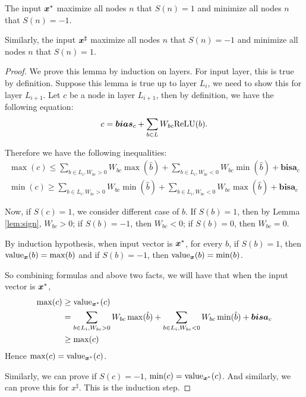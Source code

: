 	\begin{lemma}\label{lem:key1}\label{lemma2}
		
		
		
		The input $\boldsymbol{x}^*$ maximize all nodes $n$ that $S(n)=1$ and minimize all nodes $n$ that $S(n)=-1$.
		
		Similarly, the input $\boldsymbol{x}^\sharp$ maximize all nodes $n$ that $S(n)=-1$ and minimize all nodes $n$ that $S(n)=1$.
	\end{lemma}
	
	\begin{proof}
		We prove this lemma by induction on layers. For input layer, this is true by definition. Suppose this lemma is true up to layer $L_i$, we need to show this for layer $L_{i+1}$. Let $c$ be a node in layer $L_{i+1}$, then by definition, we have the following equation: \begin{align*}
			c = \boldsymbol{bias}_c+\sum_{b\in L}W_{bc}\mathrm{ReLU}(b).
		\end{align*}
		
		Therefore we have the following inequalities:\begin{align*}
				\max(c)\leq\sum_{b \in L_i, W_{bc }>0}W_{bc} \max(\hat{b}) + \sum_{b \in L_i, W_{bc}<0}W_{bc} \min(\hat{b}) + \boldsymbol{bisa}_c\\
			\min(c)\geq\sum_{b \in L_i, W_{bc}>0}W_{bc} \min(\hat{b}) + \sum_{b \in L_i, W_{bc}<0}W_{bc} \max(\hat{b}) + \boldsymbol{bisa}_c
		\end{align*}
		
		
		
		
		Now, if $S(c)=1$, we consider different case of $b$. If $S(b)=1$, then by Lemma \ref{lem:sign}, $W_{bc}>0$; if $S(b)=-1$, then $W_{bc}<0$; if $S(b)=0$, then $W_{bc}=0$.
		
		By induction hypothesis, when input vector is $\boldsymbol{x}^{*}$, for every $b$, if $S(b)=1$, then ${\textrm{value}}_{\boldsymbol{x}}(b)=\max(b)$ and if $S(b)=-1$, then ${\textrm{value}}_{\boldsymbol{x}}(b)=\min(b)$.
		
		So combining formulas and above two facts, we will have that when the input vector is $\boldsymbol{x}^*$, \begin{align*}
			\max(c)&\geq{\textrm{value}}_{\boldsymbol{x}^*}(c) \\
			&= \sum_{b \in L_i, W_{bc}>0}W_{bc} \max(\hat{b}) + \sum_{b \in L_i, W_{bc}<0}W_{bc} \min(\hat{b}) + \boldsymbol{bisa}_c\\
			&\geq\max(c)
		\end{align*}  Hence $\max(c)={\textrm{value}}_{\boldsymbol{x}^*}(c)$. 
		
		Similarly, we can prove if $S(c)=-1$, $\min(c)={\textrm{value}}_{\boldsymbol{x}^*}(c)$. And similarly, we can prove this for $x^\sharp$. This is the induction step. 
	\end{proof}
	

